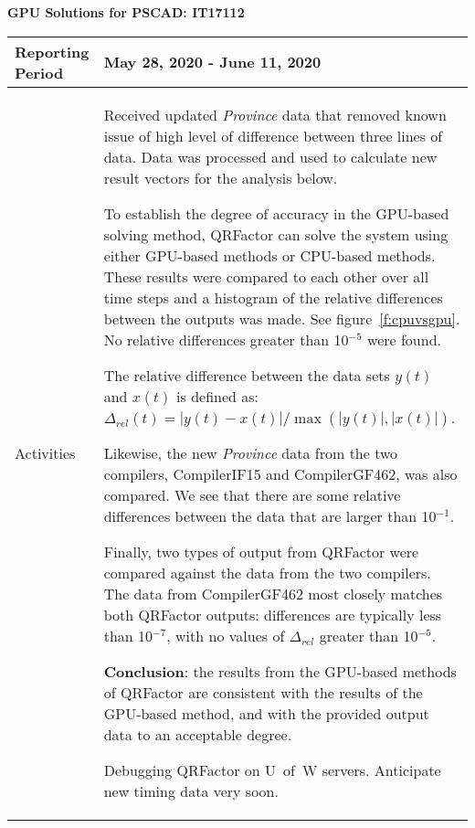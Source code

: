 \documentclass[11pt,letterpaper]{article}
\newcommand{\its}{\item[\tiny\textbullet]}
\begin{document}
\vspace{.2in}
\begin{center}
    {\bf GPU Solutions for PSCAD: IT17112}
\end{center}

	\vspace{.25in}

\begin{tabular}{| p{} | p{} |}
	\hline
	Reporting Period & May 28, 2020 - June 11, 2020 \\ \hline

	Activities & \begin{enumerate*}
	\item[\tiny\textbullet] Received updated \emph{Province} data that removed known issue of
  high level of difference between three lines of data. Data was processed and used
  to calculate new result vectors for the analysis below. \newline
  \its To establish the degree of accuracy in the GPU-based solving method, QRFactor can solve
  the system using either GPU-based methods or CPU-based methods. These results were compared
  to each other over all time steps and a histogram of the relative differences between the
  outputs was made. See figure~\ref{f:cpuvsgpu}. No relative differences greater than 10$^{-5}$
  were found. \newline
  \its The relative difference between the data sets $y(t)$ and $x(t)$ is defined as: $\Delta_{rel}(t) = |y(t) - x(t)| / \max(|y(t)|, |x(t)|)$. \newline
  \its Likewise, the new \emph{Province} data from the two compilers, CompilerIF15 and CompilerGF462,
  was also compared. We see that there are some relative differences between the data that
  are larger than 10$^{-1}$. \newline
  \its Finally, two types of output from QRFactor were compared against the data from the two
  compilers. The data from CompilerGF462 most closely matches both QRFactor outputs: differences
  are typically less than 10$^{-7}$, with no values of $\Delta_{rel}$ greater than 10$^{-5}$. \newline
  \its {\bf Conclusion}: the results from the GPU-based methods of QRFactor are consistent with
  the results of the GPU-based method, and with the provided output data to an acceptable degree. \newline
  \its Debugging QRFactor on U~of~W servers. Anticipate new timing data very soon.
	\end{enumerate*} \\ \hline


\end{tabular}
\end{document}
